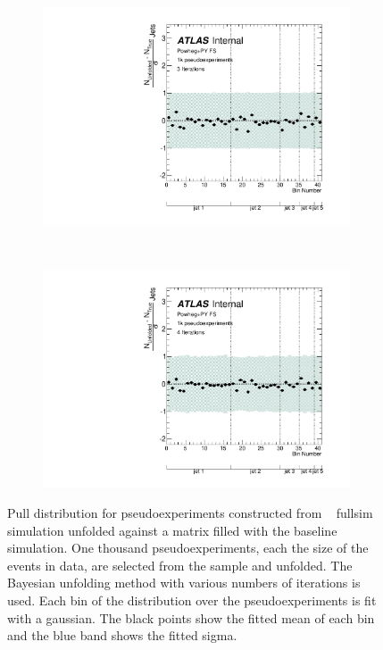 \begin{figure}
\begin{subfigure}[]{0.5\textwidth}
\includegraphics[width=\textwidth]{fig/Stress/117050fullsim/Pull3Iterations.pdf}
\end{subfigure}
~
\begin{subfigure}[]{0.5\textwidth}
\includegraphics[width=\textwidth]{fig/Stress/117050fullsim/Pull4Iterations.pdf}
\end{subfigure}
\caption{Pull distribution for pseudoexperiments constructed from \powpy~ fullsim simulation unfolded against a matrix filled with the baseline simulation. One thousand pseudoexperiments, each the size of the events in data, are selected from the sample and unfolded. The Bayesian unfolding method with various numbers of iterations is used. Each bin of the distribution over the pseudoexperiments is fit with a gaussian. The black points show the fitted mean of each bin and the blue band shows the fitted sigma.}
\label{fig:fspull}
\end{figure}
